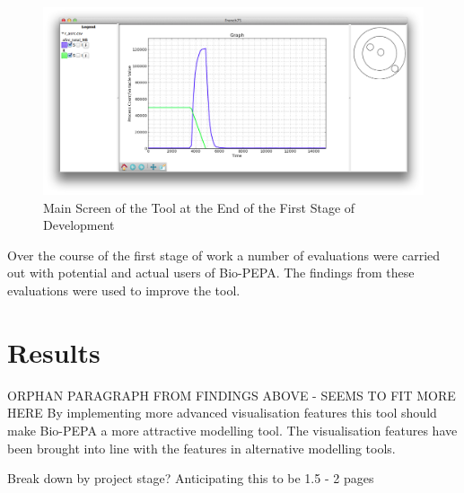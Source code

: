 \begin{figure}[h!]
    \centering
    \includegraphics[width=\textwidth]{images/french75_mac.png}
    \caption{Main Screen of the Tool at the End of the First Stage of Development}
    \label{fig:f75_mac_intro}
\end{figure}

Over the course of the first stage of work a number of evaluations were carried out with potential and actual users of Bio-PEPA.  The findings from these evaluations were used to improve the tool.

\section{Results}

ORPHAN PARAGRAPH FROM FINDINGS ABOVE - SEEMS TO FIT MORE HERE By implementing more advanced visualisation features this tool should make Bio-PEPA a more attractive modelling tool. The visualisation features have been brought into line with the features in alternative modelling tools.

Break down by project stage?  Anticipating this to be 1.5 - 2 pages

